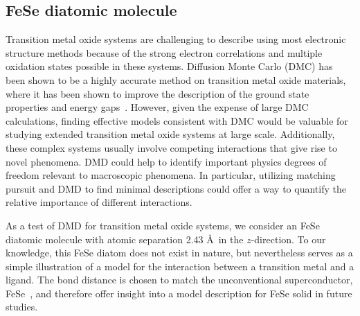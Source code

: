 \subsection{FeSe diatomic molecule}
\label{subsection:fese}
Transition metal oxide systems are challenging to describe using most electronic structure methods because of the strong electron correlations and multiple oxidation states possible in these systems. %
Diffusion Monte Carlo (DMC) has been shown to be a highly accurate method on transition metal oxide materials, where it has been shown to improve the description of the ground state properties and energy gaps~\cite{Foyevtsova2014, Wagner_Abbamonte, Zheng2015, Wagner2016}. %
However, given the expense of large DMC calculations, finding effective models consistent with DMC would be valuable for studying extended transition metal oxide systems at large scale.
Additionally, these complex systems usually involve competing interactions that give rise to novel phenomena. 
DMD could help to identify important physics degrees of freedom relevant to macroscopic phenomena.
In particular, utilizing matching pursuit and DMD to find minimal descriptions could offer a way to quantify the relative importance of different interactions.

As a test of DMD for transition metal oxide systems, we consider an FeSe diatomic molecule with atomic separation 2.43 \AA~in the $z$-direction.
To our knowledge, this FeSe diatom does not exist in nature, but nevertheless serves as a simple illustration of a model for the interaction between a transition metal and a ligand. 
The bond distance is chosen to match the unconventional superconductor, FeSe~\cite{kumar_crystal_2010}, and therefore offer insight into a model description for FeSe solid in future studies.


